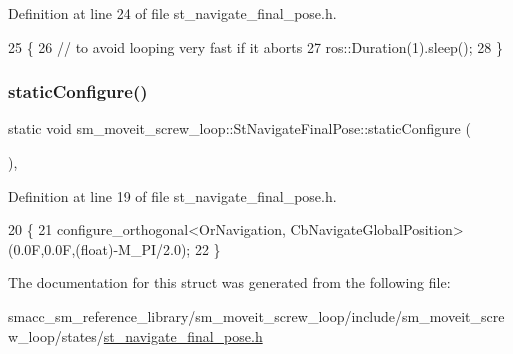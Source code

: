Definition at line 24 of file st\+\_\+navigate\+\_\+final\+\_\+pose.\+h.


\begin{DoxyCode}
25     \{
26         \textcolor{comment}{// to avoid looping very fast if it aborts}
27         ros::Duration(1).sleep();
28     \}
\end{DoxyCode}
\mbox{\label{structsm__moveit__screw__loop_1_1StNavigateFinalPose_a71b723e8072096aa9dd95ab99857317f}} 
\subsubsection{\texorpdfstring{static\+Configure()}{staticConfigure()}}
{\footnotesize\ttfamily static void sm\+\_\+moveit\+\_\+screw\+\_\+loop\+::\+St\+Navigate\+Final\+Pose\+::static\+Configure (\begin{DoxyParamCaption}{ }\end{DoxyParamCaption})\hspace{0.3cm}{\ttfamily [inline]}, {\ttfamily [static]}}



Definition at line 19 of file st\+\_\+navigate\+\_\+final\+\_\+pose.\+h.


\begin{DoxyCode}
20     \{
21         configure\_orthogonal<OrNavigation, CbNavigateGlobalPosition>(0.0F,0.0F,(float)-M\_PI/2.0);
22     \}
\end{DoxyCode}


The documentation for this struct was generated from the following file\+:\begin{DoxyCompactItemize}
\item 
smacc\+\_\+sm\+\_\+reference\+\_\+library/sm\+\_\+moveit\+\_\+screw\+\_\+loop/include/sm\+\_\+moveit\+\_\+screw\+\_\+loop/states/\hyperlink{sm__moveit__screw__loop_2include_2sm__moveit__screw__loop_2states_2st__navigate__final__pose_8h}{st\+\_\+navigate\+\_\+final\+\_\+pose.\+h}\end{DoxyCompactItemize}
